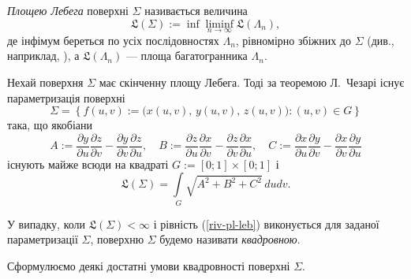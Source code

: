 \documentclass[11pt, reqno]{amsart}
\begin{document}
\textit{Площею Лебега} поверхні $\Sigma$ називається величина
$$\mathfrak{L}(\Sigma):=\inf\liminf\limits_{n\rightarrow\infty}
\mathfrak{L}(\Lambda_n),$$ де інфімум береться по усіх
послідовностях $\Lambda_n$, рівномірно збіжних до $\Sigma$ (див.,
наприклад, \cite[c. 468]{Rado}), а $\mathfrak{L}(\Lambda_n)$ ---
площа багатогранника $\Lambda_n$.


Нехай поверхня $\Sigma$ має скінченну площу Лебега. Тоді за
теоремою Л.~Чезарі \cite[с.~7]{Cesari}
 існує параметризація поверхні
$$
\Sigma=\left\{f(u,v):=\big(x(u,v),\,y(u,v),\,z(u,v)\big):(u,v)\in
G\right\}
$$
така, що якобіани
\begin{equation}\label{Jacobiany}
A:=\frac{\partial y}{\partial u}\frac{\partial z}{\partial
v}-\frac{\partial y}{\partial v}\frac{\partial z}{\partial u},
\quad B:=\frac{\partial z}{\partial u}\frac{\partial x}{\partial
v}-\frac{\partial z}{\partial v}\frac{\partial x}{\partial
u},\quad C:=\frac{\partial x}{\partial u}\frac{\partial
y}{\partial v}-\frac{\partial
x}{\partial v}\frac{\partial y}{\partial u} 
\end{equation}
існують майже всюди на квадраті $G:=[0;1]\times [0;1]$ і
\begin{equation}\label{riv-pl-leb}
\mathfrak{L}(\Sigma)=\int\limits_{G}\sqrt{A^2+B^2+C^2}\,dudv.
\end{equation}

У випадку, коли $\mathfrak{L}(\Sigma)<\infty$ і рівність
(\ref{riv-pl-leb}) виконується для заданої параметризації
$\Sigma$, поверхню  $\Sigma$ будемо називати {\it квадровною}.

Сформулюємо деякі достатні умови квадровності поверхні $\Sigma$.
\end{document}
